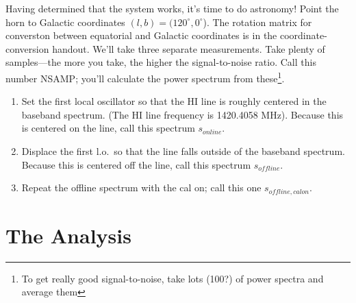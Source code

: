 \documentclass[11pt,preprint]{aastex}
\begin{document}
Having determined that the system works, it's time to do astronomy!
Point the horn to Galactic coordinates $(l,b) = (120^\circ, 0^\circ$). 
The rotation matrix for converston between equatorial and Galactic
coordinates is in the coordinate-conversion handout.  We'll take three
separate measurements.  Take plenty of samples---the more you take, the
higher the signal-to-noise ratio.  Call this number NSAMP; you'll
calculate the power spectrum from these\footnote{To get really good
signal-to-noise, take lots (100?) of power spectra and average them}. 
\begin{enumerate}

\item Set the first local oscillator so that the HI line is roughly centered
  in the baseband spectrum. (The HI line frequency is 1420.4058 MHz).
  Because this is centered on the line, call this spectrum $s_{online}$.

\item Displace the first l.o.\ so that the line falls outside of the baseband
  spectrum. Because this is centered off the line, call this spectrum
  $s_{offline}$.

\item Repeat the offline spectrum with the cal on; call this one
  $s_{offline, calon}$.
\end{enumerate}

\section{The Analysis}
\end{document}
